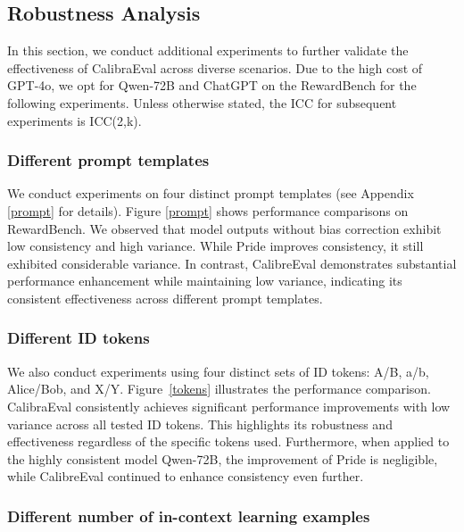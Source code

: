 \documentclass[sigconf]{acmart}
\begin{document}
\subsection{Robustness Analysis}
\label{Robustness}
In this section, we conduct additional experiments to further validate the effectiveness of CalibraEval across diverse scenarios. Due to the high cost of GPT-4o, we opt for Qwen-72B and ChatGPT on the RewardBench for the following experiments. Unless otherwise stated, the ICC for subsequent experiments is ICC(2,k).

\subsubsection{Different prompt
templates}

We conduct experiments on four distinct prompt templates (see Appendix \ref{prompt} for details). Figure \ref{prompt} shows performance comparisons on RewardBench. We observed that model outputs without bias correction exhibit low consistency and high variance. While Pride improves consistency, it still exhibited considerable variance. In contrast, CalibreEval demonstrates substantial performance enhancement while maintaining low variance, indicating its consistent effectiveness across different prompt templates.



\subsubsection{Different ID
tokens}


We also conduct experiments using four distinct sets of ID tokens: A/B, a/b, Alice/Bob, and X/Y. Figure~\ref{tokens} illustrates the performance comparison. 
CalibraEval consistently achieves significant performance improvements with low variance across all tested ID tokens. This highlights its robustness and effectiveness regardless of the specific tokens used. Furthermore, when applied to the highly consistent model Qwen-72B, the improvement of Pride is negligible, while CalibreEval continued to enhance consistency even further.

\subsubsection{Different number of in-context learning examples}
\end{document}
